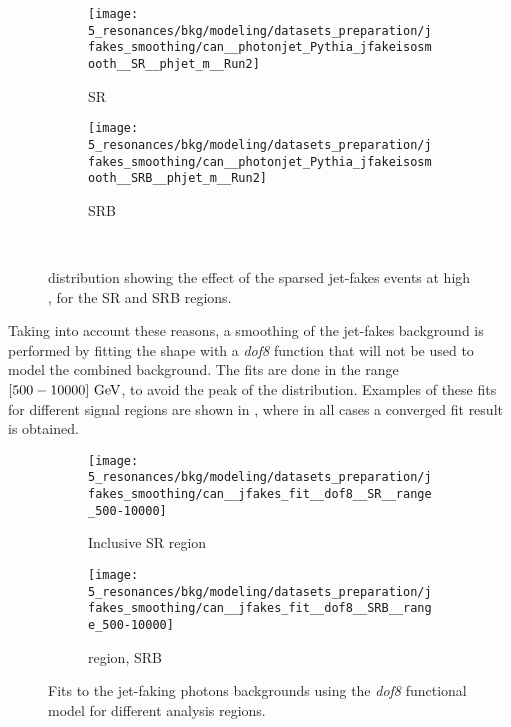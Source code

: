 \begin{figure}[ht!]
    \centering
    \begin{subfigure}[h]{0.49\linewidth}
        \centering
        \texttt{[image: 5\_resonances/bkg/modeling/datasets\_preparation/jfakes\_smoothing/can\_\_photonjet\_Pythia\_jfakeisosmooth\_\_SR\_\_phjet\_m\_\_Run2]}
        \caption{SR}
    \end{subfigure}
    \hfill
    \begin{subfigure}[h]{0.49\linewidth}
        \centering
        \texttt{[image: 5\_resonances/bkg/modeling/datasets\_preparation/jfakes\_smoothing/can\_\_photonjet\_Pythia\_jfakeisosmooth\_\_SRB\_\_phjet\_m\_\_Run2]}
        \caption{SRB}
    \end{subfigure}\\
    \caption{\myj distribution showing the effect of the sparsed jet-fakes events at high \myj, for the SR and SRB regions.}
    \label{fig:bkg:modeling:preparation:jfakes_smooth:bkg_myj_distribution}
\end{figure}

Taking into account these reasons, a smoothing of the jet-fakes background is performed by fitting the \myj shape with a \textit{dof8} function that will not be used to model the combined background.
The fits are done in the range \([500-10000]~\text{GeV}\), to avoid the peak of the \myj distribution. Examples of these fits for different signal regions are shown in \Fig{\ref{fig:bkg:modeling:preparation:jfakes_smooth:jfakes_fits}}, where in all cases a converged fit result is obtained.

\begin{figure}[ht!]
    \centering
    \begin{subfigure}[h]{0.49\linewidth}
        \centering
        \texttt{[image: 5\_resonances/bkg/modeling/datasets\_preparation/jfakes\_smoothing/can\_\_jfakes\_fit\_\_dof8\_\_SR\_\_range\_500-10000]}
        \caption{Inclusive SR region}
    \end{subfigure}
    \hfill
    \begin{subfigure}[h]{0.49\linewidth}
        \centering
        \texttt{[image: 5\_resonances/bkg/modeling/datasets\_preparation/jfakes\_smoothing/can\_\_jfakes\_fit\_\_dof8\_\_SRB\_\_range\_500-10000]}
        \caption{\btag region, SRB}
    \end{subfigure}
    \caption{Fits to the jet-faking photons backgrounds using the \textit{dof8} functional model for different analysis regions.}
    \label{fig:bkg:modeling:preparation:jfakes_smooth:jfakes_fits}
\end{figure}


